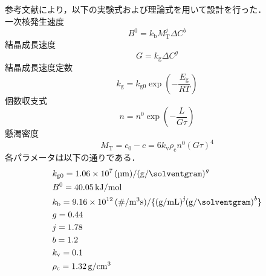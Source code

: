 \documentclass[a4j]{jsreport}
\begin{document}
参考文献\cite{晶析}により，以下の実験式および理論式を用いて設計を行った．\\
一次核発生速度
\begin{equation}
    B^0 = k_\mathrm{b} M_\mathrm{T}^j \Delta C^b
\end{equation}
結晶成長速度
\begin{equation}
    G = k_\mathrm{g}\Delta C^g
\end{equation}
結晶成長速度定数
\begin{equation}
    k_\mathrm{g} = k_\mathrm{g0} \exp \left( -\frac{E_\mathrm{g}}{RT} \right)
\end{equation}
個数収支式
\begin{equation}
    n=n^0 \exp \left( -\frac{L}{G\tau} \right)
\end{equation}
懸濁密度
\begin{equation}
    M_\mathrm{T} = c_0-c = 6k_\mathrm{v} \rho_\mathrm{c} n^0 (G\tau)^4
\end{equation}
各パラメータは以下の通りである．
\begin{align*}
    &k_\mathrm{g0} = 1.06\times10^7 \, \si{(\micro \meter)/(\gram / \solventgram)^{\textit{g}}} \\
    &B^{\mathrm{0}} = 40.05 \, \si{\kilo \joule / \mole} \\
    &k_\mathrm{b} = 9.16 \times 10^{12} \, \si{(\# / \cubic \meter \second) / \{ (\gram / \milli \liter)^{\textit{j}} (\gram / \solventgram)^{\textit{b}} \} } \\
    &g = 0.44 \\
    &j = 1.78 \\
    &b = 1.2 \\
    &k_\mathrm{v} = 0.1 \\
    &\rho_\mathrm{c} = 1.32 \, \si{\gram / \centi \metre \cubed}
\end{align*}
\end{document}

